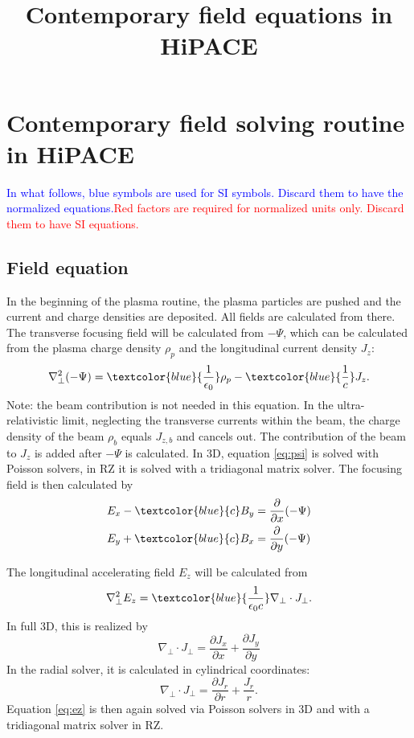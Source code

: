 \documentclass{article}
\title{Contemporary field equations in HiPACE}
\begin{document}
\section*{Contemporary field solving routine in HiPACE}
\label{se:pic_rad_field_solver}

\newcommand{\blue}[1]{\textcolor{blue}{#1}}
\newcommand{\red}[1]{\textcolor{red}{#1}}

\blue{In what follows, blue symbols are used for SI symbols. Discard them to have the normalized equations.}\red{Red factors are required for normalized units only. Discard them to have SI equations.}

\subsection*{Field equation}

In the beginning of the plasma routine, the plasma particles are pushed and the current and charge densities are deposited. All fields are calculated from there.
The transverse focusing field will be calculated from $-\Psi$, which can be calculated from the plasma charge density $\rho_p$ and the longitudinal current density $J_z$:
\begin{equation}
\nabla^2_{\perp} (- \Psi)  = \blue{\frac{1}{\epsilon_0}}\rho_p - \blue{\frac{1}{c}}J_z .
\label{eq:psi}
\end{equation}
Note: the beam contribution is not needed in this equation. In the ultra-relativistic limit, neglecting the transverse currents within the beam, the charge density of the beam $\rho_b$ equals $J_{z,b}$ and cancels out. The contribution of the beam to $J_z$ is added after $-\Psi$ is calculated.
In 3D, equation \ref{eq:psi} is solved with Poisson solvers, in RZ it is solved with a tridiagonal matrix solver.
The focusing field is then calculated by
\begin{subequations}
\begin{align}
    E_x - \blue{c}B_y &= \frac{\partial}{\partial x} (-\Psi) \\
    E_y + \blue{c}B_x &= \frac{\partial}{\partial y} (-\Psi)
\end{align}
\end{subequations}


The longitudinal accelerating field $E_z$ will be calculated from
\begin{equation} \label{eq:ez}
\nabla^2_{\perp} E_z = \blue{\frac{1}{\epsilon_0 c}} \nabla_{\perp} \cdot  J_{\perp} .
\end{equation}
In full 3D, this is realized by
\begin{equation}
    \nabla_{\perp} \cdot J_{\perp} = \frac{\partial J_x}{\partial x} +  \frac{\partial J_y}{\partial y}
\end{equation}
In the radial solver, it is calculated in cylindrical coordinates:
\begin{equation}
    \nabla_{\perp} \cdot J_{\perp} = \frac{\partial J_r}{\partial r} + \frac{J_r}{r}.
\end{equation}
Equation \ref{eq:ez} is then again solved via Poisson solvers in 3D and with a tridiagonal matrix solver in RZ.
\end{document}
